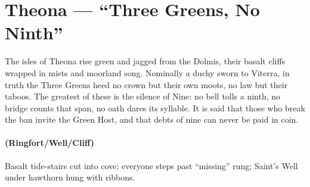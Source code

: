 \section{Theona --- ``Three Greens, No Ninth''}
\label{chap:theona}

\begin{tcolorbox}[colback=black!3,colframe=black!40!white,title={Theme \& Atmosphere}]
The isles of Theona rise green and jagged from the Dolmis, their basalt cliffs wrapped in mists and moorland song. Nominally a duchy sworn to Viterra, in truth the Three Greens heed no crown but their own moots, no law but their taboos. The greatest of these is the silence of Nine: no bell tolls a ninth, no bridge counts that span, no oath dares its syllable. It is said that those who break the ban invite the Green Host, and that debts of nine can never be paid in coin.
\end{tcolorbox}

\paragraph*{(Ringfort/Well/Cliff)} Basalt tide-stairs cut into cove; everyone steps past ``missing'' rung; Saint's Well under hawthorn hung with ribbons.

